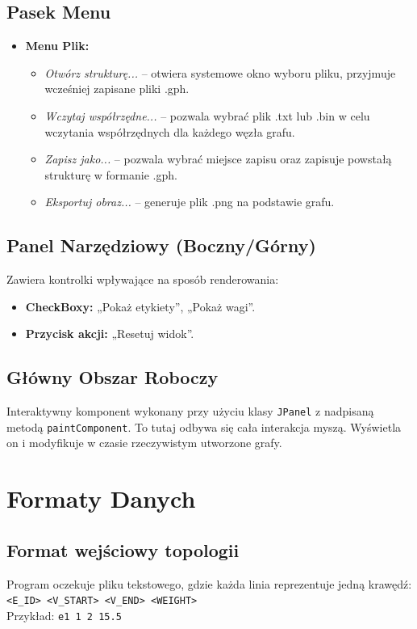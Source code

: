 \documentclass[12pt, a4paper]{article}
\begin{document}
\subsection{Pasek Menu}
\begin{itemize}
    \item \textbf{Menu Plik:} 
    \begin{itemize}
        \item \textit{Otwórz strukturę...} – otwiera systemowe okno wyboru pliku, przyjmuje wcześniej zapisane pliki .gph.
        \item \textit{Wczytaj współrzędne...} – pozwala wybrać plik .txt lub .bin w celu wczytania współrzędnych dla każdego węzła grafu.
        \item \textit{Zapisz jako...} – pozwala wybrać miejsce zapisu oraz zapisuje powstałą strukturę w formanie .gph.
        \item \textit{Eksportuj obraz...} – generuje plik .png na podstawie grafu.
    \end{itemize}
\end{itemize}

\subsection{Panel Narzędziowy (Boczny/Górny)}
Zawiera kontrolki wpływające na sposób renderowania:
\begin{itemize}
    \item \textbf{CheckBoxy:} „Pokaż etykiety”, „Pokaż wagi”.
    \item \textbf{Przycisk akcji:} „Resetuj widok”.
\end{itemize}

\subsection{Główny Obszar Roboczy}
Interaktywny komponent wykonany przy użyciu klasy \texttt{JPanel} z nadpisaną metodą \texttt{paintComponent}. To tutaj odbywa się cała interakcja myszą. Wyświetla on i modyfikuje w czasie rzeczywistym utworzone grafy. 

\section{Formaty Danych}
\subsection{Format wejściowy topologii}
Program oczekuje pliku tekstowego, gdzie każda linia reprezentuje jedną krawędź:
\\ \texttt{<E\_ID> <V\_START> <V\_END> <WEIGHT>}
\\ Przykład: \texttt{e1 1 2 15.5}
\end{document}

